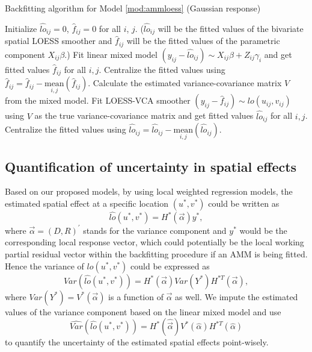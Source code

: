 	\begin{algorithm}[H]
		\caption{Backfitting algorithm for Model \ref{mod:ammloess} (Gaussian response)}
		\label{alg:bfmm}
		\begin{algorithmic}
			\State Initialize $\hat{lo}_{ij}=0$, $\hat{f}_{ij}=0$ for all $i$, $j$. 
			($\hat{lo}_{ij}$ will be the fitted values of the bivariate spatial LOESS smoother and $\hat{f}_{ij}$ will be the fitted values of the parametric component $X_{ij}\beta$.)
			\State Fit linear mixed model $(y_{ij}-\hat{lo}_{ij})\sim X_{ij}\beta + Z_{ij}\gamma_i$ and get fitted values $\hat{f}_{ij}$ for all $i,j$. 
			\State Centralize the fitted values using $\hat{f}_{ij}=\hat{f}_{ij}-\underset{i,j} {\text{mean}}(\hat{f}_{ij})$.
			\State Calculate the estimated variance-covariance matrix $V$ from the mixed model. 
			\State Fit LOESS-VCA smoother $(y_{ij}-\hat{f}_{ij}) \sim lo(u_{ij},v_{ij})$ using $V$ as the true variance-covariance matrix and get fitted values $\hat{lo}_{ij}$ for all $i,j$. 
			\State Centralize the fitted values using $\hat{lo}_{ij}=\hat{lo}_{ij}-\underset{i,j} {\text{mean}}(\hat{lo}_{ij})$.
			\EndWhile
		\end{algorithmic}
	\end{algorithm}
	
	\subsection{Quantification of uncertainty in spatial effects}
	\label{s:Uncertain}
	Based on our proposed models, by using local weighted regression models, the estimated spatial effect at a specific location $(u^*,v^*)$ could be written as 
	\begin{equation} \label{eq:haty}
	\hat{lo}(u^*,v^*)=H^*(\Vec{\alpha})y^*,
	\end{equation}
	where $\vec{\alpha}=(D,R)^\prime$ stands for the variance component and $y^*$ would be the corresponding local response vector, which could potentially be the local working partial residual vector within the backfitting procedure if an AMM is being fitted. Hence the variance of $\hat{lo}(u^*,v^*)$ could be expressed as 
	\begin{equation} \label{eq:VarLO}
	Var(\hat{lo}(u^*,v^*))=H^*(\Vec{\alpha})Var(Y^*)H^{*T}(\vec{\alpha}),
	\end{equation}
	where $Var(Y^*)=V^*(\Vec{\alpha})$ is a function of $\Vec{\alpha}$ as well. We impute the estimated values of the variance component based on the linear mixed model and use
	\begin{equation} \label{eq:EVarLO}
	\widehat{Var}(\hat{lo}(u^*,v^*))=H^*(\hat{\Vec{\alpha}})V^*(\hat{\alpha})H^{*T}(\hat{\alpha})
	\end{equation}
	to quantify the uncertainty of the estimated spatial effects point-wisely. 
	
